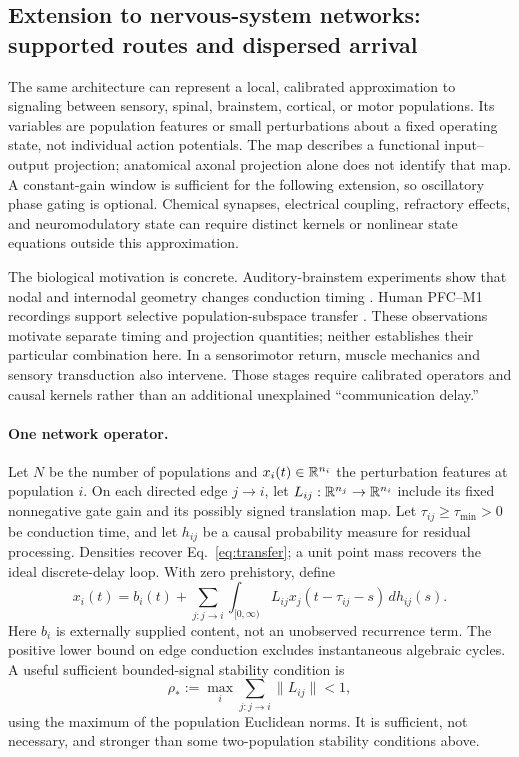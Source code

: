 \subsection{Extension to nervous-system networks: supported routes and dispersed arrival}\label{sec:nervous-network}
The same architecture can represent a local, calibrated approximation to signaling between sensory, spinal, brainstem, cortical, or motor populations. Its variables are population features or small perturbations about a fixed operating state, not individual action potentials. The map describes a functional input--output projection; anatomical axonal projection alone does not identify that map. A constant-gain window is sufficient for the following extension, so oscillatory phase gating is optional. Chemical synapses, electrical coupling, refractory effects, and neuromodulatory state can require distinct kernels or nonlinear state equations outside this approximation.

The biological motivation is concrete. Auditory-brainstem experiments show that nodal and internodal geometry changes conduction timing \citep{ford2015}. Human PFC--M1 recordings support selective population-subspace transfer \citep{binish2026}. These observations motivate separate timing and projection quantities; neither establishes their particular combination here. In a sensorimotor return, muscle mechanics and sensory transduction also intervene. Those stages require calibrated operators and causal kernels rather than an additional unexplained ``communication delay.''

\paragraph{One network operator.} Let $N$ be the number of populations and $x_i(t)\in\mathbb R^{n_i}$ the perturbation features at population $i$. On each directed edge $j\to i$, let $L_{ij}:\mathbb R^{n_j}\to\mathbb R^{n_i}$ include its fixed nonnegative gate gain and its possibly signed translation map. Let $\tau_{ij}\ge\tau_{\min}>0$ be conduction time, and let $h_{ij}$ be a causal probability measure for residual processing. Densities recover Eq.~\eqref{eq:transfer}; a unit point mass recovers the ideal discrete-delay loop. With zero prehistory, define
\begin{equation}
x_i(t)=b_i(t)+\sum_{j:j\to i}\int_{[0,\infty)}L_{ij}x_j(t-\tau_{ij}-s)\,dh_{ij}(s).
\label{eq:network-transfer}
\end{equation}
Here $b_i$ is externally supplied content, not an unobserved recurrence term. The positive lower bound on edge conduction excludes instantaneous algebraic cycles. A useful sufficient bounded-signal stability condition is
\[
\rho_*:=\max_i\sum_{j:j\to i}\|L_{ij}\|<1,
\]
using the maximum of the population Euclidean norms. It is sufficient, not necessary, and stronger than some two-population stability conditions above.

